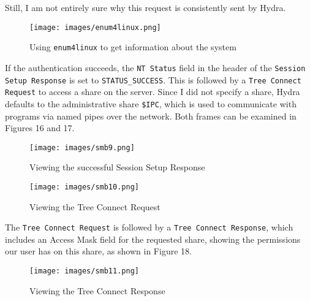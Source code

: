 \documentclass[a4paper]{article}
\newcommand{\abc}{\hfill \break}
\begin{document}
Still, I am not entirely sure why this request is consistently sent by Hydra.\cite{smb-brute-forcing-tipps,noauthor_thc-hydrahydra-smb2c_nodate}
\begin{figure}[h]
	\texttt{[image: images/enum4linux.png]}
	\centering
	\caption{Using \texttt{enum4linux} to get information about the system}
\end{figure}\newpage
\abc
If the authentication succeeds, the \texttt{NT Status} field in the header of the \texttt{Session Setup Response} is set to \texttt{STATUS\_SUCCESS}. This is followed by a \texttt{Tree Connect Request} to access a share on the server. Since I did not specify a share, Hydra defaults to the administrative share \texttt{\$IPC}, which is used to communicate with programs via named pipes over the network. \cite{noauthor_managing_2021} Both frames can be examined in Figures 16 and 17.
\begin{figure}[ht]
	\texttt{[image: images/smb9.png]}
	\centering
	\caption{Viewing the successful Session Setup Response}
\end{figure}\abc
\begin{figure}[h]
	\texttt{[image: images/smb10.png]}
	\centering
	\caption{Viewing the Tree Connect Request}
\end{figure}\abc
\newpage
\abc
The \texttt{Tree Connect Request} is followed by a \texttt{Tree Connect Response}, which includes an Access Mask field for the requested share, showing the permissions our user has on this share, as shown in Figure 18.
\begin{figure}[h]
	\texttt{[image: images/smb11.png]}
	\centering
	\caption{Viewing the Tree Connect Response}
\end{figure}\abc \newpage
\end{document}
